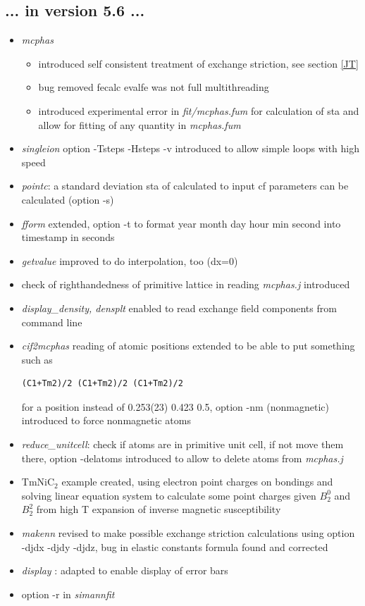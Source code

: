 \documentclass[twoside]{article}
\newcommand{\prg}{\sl}
\begin{document}
\subsection*{ ... in version 5.6 ...}
\begin{itemize}
\item {\prg mcphas}
\begin{itemize}\item introduced self consistent treatment of exchange striction, see section \ref{JT}
 \item bug removed fecalc evalfe was not full multithreading
 \item introduced experimental error in {\prg fit/mcphas.fum} for calculation of sta
            and allow for fitting of any quantity in {\prg mcphas.fum}
\end{itemize}
\item {\prg singleion} option -Tsteps -Hsteps -v introduced to allow simple loops with high speed 
\item {\prg pointc}: a standard deviation sta of calculated  to input cf parameters can be calculated (option -s)
\item {\prg fform} extended, option -t to format year month day hour min second into timestamp in seconds
\item {\prg getvalue} improved to do interpolation, too (dx=0)
\item  check of righthandedness of primitive lattice in reading {\prg mcphas.j} introduced
\item {\prg display\_density, densplt} enabled to read exchange field components from command line
\item {\prg cif2mcphas} reading of atomic positions extended to be able to put something such as
         \begin{verbatim}(C1+Tm2)/2 (C1+Tm2)/2 (C1+Tm2)/2\end{verbatim} for a position instead of 0.253(23) 0.423  0.5, 
option -nm (nonmagnetic) introduced to force nonmagnetic atoms
\item {\prg reduce\_unitcell}: check if atoms are in primitive unit cell, if not
         move them there, option -delatoms introduced to allow to delete atoms from {\prg mcphas.j}
\item TmNiC$_2$ example created, using electron point charges on bondings
         and solving linear equation system to calculate some point charges
         given $B_2^0$ and $B_2^2$ from high T expansion of inverse magnetic susceptibility
\item {\prg makenn} 
revised to make possible exchange striction calculations using option -djdx -djdy -djdz,
bug in elastic constants formula found and corrected 
\item           {\prg  display }: adapted to enable display of error bars 
\item            option -r in {\prg simannfit}
\end{itemize}
\end{document}
